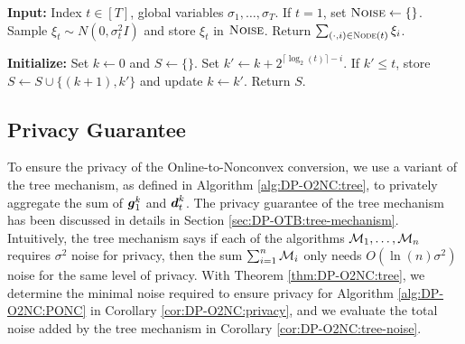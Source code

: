 \begin{algorithm}[t]
\begin{algorithmic}[1]
    \Statex \textbf{Input:} Index $t\in[T]$, global variables $\sigma_1,\ldots,\sigma_T$.
    \State If $t=1$, set $\textsc{Noise}\gets\{\}$.
    \State Sample $\xi_t \sim N(0,\sigma_t^2 I)$ and store $\xi_t$ in $\textsc{Noise}$.
    \State Return $\sum_{(\cdot,i)\in \textsc{Node}(t)} \xi_i$.

    \vspace{1em}

        \State \textbf{Initialize:} Set $k\gets 0$ and $S\gets\{\}$.
            \State Set $k'\gets k+2^{\lceil\log_2(t)\rceil-i}$. If $k' \le t$, store $S\gets S\cup\{(k+1),k'\}$ and update $k\gets k'$.
        \EndFor
        \State Return $S$.
    \EndFunction
\end{algorithmic}
\caption{Tree Mechanism}
\label{alg:DP-O2NC:tree}
\end{algorithm}



\subsection{Privacy Guarantee}
\label{sec:DP-O2NC_privacy}

To ensure the privacy of the Online-to-Nonconvex conversion, we use a variant of the tree mechanism, as defined in Algorithm \ref{alg:DP-O2NC:tree}, to privately aggregate the sum of ${\boldsymbol{g}}_1^k$ and ${\boldsymbol{d}}_t^k$. The privacy guarantee of the tree mechanism has been discussed in details in Section \ref{sec:DP-OTB:tree-mechanism}. Intuitively, the tree mechanism says if each of the algorithms ${\cal M}_1,\ldots,{\cal M}_n$ requires $\sigma^2$ noise for privacy, then the sum $\sum_{i=1}^n{\cal M}_i$ only needs $O(\ln(n)\sigma^2)$ noise for the same level of privacy. With Theorem \ref{thm:DP-O2NC:tree}, we determine the minimal noise required to ensure privacy for Algorithm \ref{alg:DP-O2NC:PONC} in Corollary \ref{cor:DP-O2NC:privacy}, and we evaluate the total noise added by the tree mechanism in Corollary \ref{cor:DP-O2NC:tree-noise}.

